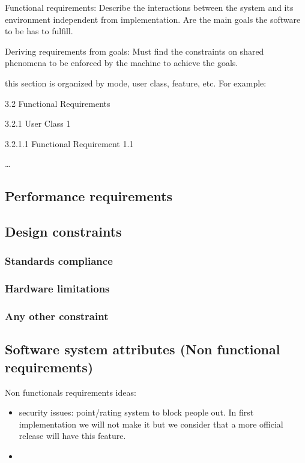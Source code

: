 Functional requirements: Describe the interactions between the system and its environment independent from implementation. Are the main goals the software to be has to fulfill.

Deriving requirements from goals: Must find the constraints on shared phenomena to be enforced by the machine to achieve the goals.

this section is organized by mode, user class, feature, etc. For example:

3.2 Functional Requirements

3.2.1 User Class 1

3.2.1.1 Functional Requirement 1.1

…

\subsection{Performance requirements}
\label{subsect:performancerequirements}

\subsection{Design constraints}
\label{subsect:designconstraints}

\subsubsection{Standards compliance}
\label{subsubsect:standardscompliance}

\subsubsection{Hardware limitations}
\label{subsubsect:hardwarelimitations}

\subsubsection{Any other constraint}
\label{subsubsect:anyotherconstraint}

\subsection{Software system attributes (Non functional requirements)}
\label{subsect:softwaresystemattributes}

Non functionals requirements ideas:
\begin{itemize}
    \item security issues: point/rating system to block people out. In first implementation we will not make it but we consider that a more official release will have this feature.
    \item 
\end{itemize}


